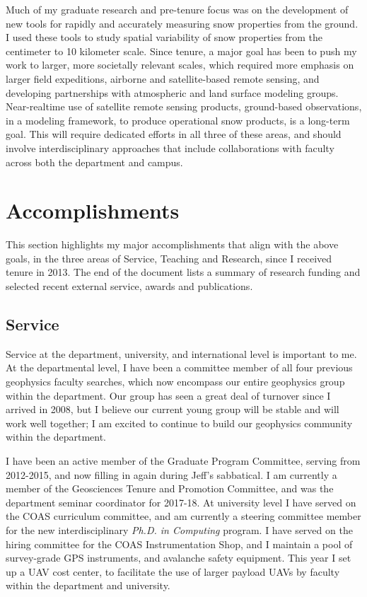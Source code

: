 \documentclass[11pt]{article}
\begin{document}
Much of my graduate research and pre-tenure focus was on the development of new tools for rapidly and accurately measuring snow properties from the ground.  I used these tools to study spatial variability of snow properties from the centimeter to 10 kilometer scale.  Since tenure, a major goal has been to push my work to larger, more societally relevant scales, which required more emphasis on larger field expeditions, airborne and satellite-based remote sensing, and developing partnerships with atmospheric and land surface modeling groups.  Near-realtime use of satellite remote sensing products, ground-based observations, in a modeling framework, to produce operational snow products, is a long-term goal.  This will require dedicated efforts in all three of these areas, and should involve interdisciplinary approaches that include collaborations with faculty across both the department and campus.

\section{Accomplishments}

This section highlights my major accomplishments that align with the above goals, in the three areas of Service, Teaching and Research, since I received tenure in 2013.  The end of the document lists a summary of research funding and selected recent external service, awards and publications.

\subsection{Service}

Service at the department, university, and international level is important to me.  At the departmental level, I have been a committee member of all four previous geophysics faculty searches, which now encompass our entire geophysics group within the department.  Our group has seen a great deal of turnover since I arrived in 2008, but I believe our current young group will be stable and will work well together; I am excited to continue to build our geophysics community within the department.  

I have been an active member of the Graduate Program Committee, serving from 2012-2015, and now filling in again during Jeff's sabbatical.  I am currently a member of the Geosciences Tenure and Promotion Committee, 
and was the department seminar coordinator for 2017-18.  At university level I have served on the COAS curriculum committee, and am currently a steering committee member for the new interdisciplinary \textit{Ph.D. in Computing} program.  I have served on the hiring committee for the COAS Instrumentation Shop, and I maintain a pool of survey-grade GPS instruments, and avalanche safety equipment.  This year I set up a UAV cost center, to facilitate the use of larger payload UAVs by faculty within the department and university.
\end{document}
